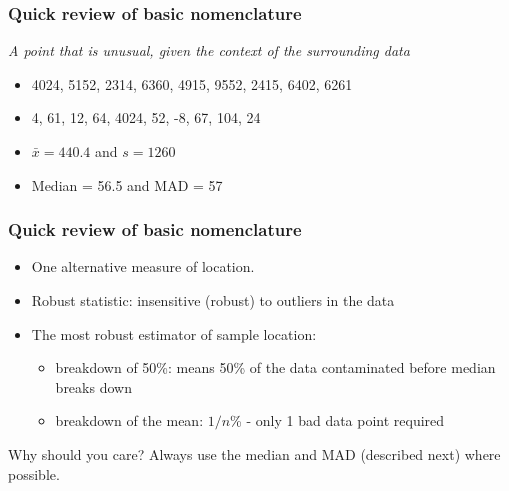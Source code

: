 \begin{frame}\frametitle{Quick review of basic nomenclature}
	\begin{block}
		{}
		\begin{center}
			\emph{A point that is unusual, given the context of the surrounding data}
		\end{center}
	\end{block}
	\begin{itemize}
		\item	4024, 5152, 2314, 6360, 4915, 9552, 2415, 6402, 6261
		\item	4, 61, 12, 64, 4024, 52, -8, 67, 104, 24
	\end{itemize}

	\vspace{12pt}
	\begin{itemize}
		\item	$\bar{x} = 440.4$  and $s = 1260$
		\item	Median = 56.5 and MAD = 57
	\end{itemize}
\end{frame}

\begin{frame}\frametitle{Quick review of basic nomenclature}
	{}
	\begin{itemize}
		\item	One alternative measure of location.
		\item	Robust statistic: insensitive (robust) to outliers in the data
		\item	The most robust estimator of sample location:
		\begin{itemize}
			\item	breakdown of 50\%: means 50\% of the data contaminated before median breaks down
			\item	breakdown of the mean: $1/n$\% - only 1 bad data point required
		\end{itemize}
	\end{itemize}
	\begin{exampleblock}{Why should you care?}
		Always use the median and MAD (described next) where possible.
	\end{exampleblock}
\end{frame}

